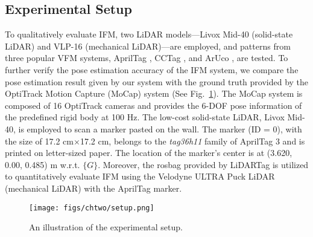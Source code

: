 \subsection{Experimental Setup}
To qualitatively evaluate IFM, two LiDAR models—Livox Mid-40 (solid-state LiDAR) and VLP-16 (mechanical LiDAR)—are employed, and patterns from three popular VFM systems, AprilTag \cite{ap3}, CCTag \cite{cctag}, and ArUco \cite{aruco}, are tested. To further verify the pose estimation accuracy of the IFM system, we compare the pose estimation result given by our system with the ground truth provided by the OptiTrack Motion Capture (MoCap) system (See Fig.~\ref{setup}). The MoCap system is composed of 16 OptiTrack cameras and provides the 6-DOF pose information of the predefined rigid body at 100 Hz. The low-cost solid-state LiDAR, Livox Mid-40, is employed to scan a marker pasted on the wall. The marker (ID = 0), with the size of 17.2 cm$\times$17.2 cm, belongs to the \textit{tag36h11} family of AprilTag 3 \cite{ap3} and is printed on letter-sized paper. The location of the marker's center is at (3.620, 0.00, 0.485) m w.r.t. $\{G\}$. Moreover, the rosbag provided by LiDARTag \cite{lt} is utilized to quantitatively evaluate IFM using the Velodyne ULTRA Puck LiDAR (mechanical LiDAR) with the AprilTag marker.
\par
\begin{figure}[H] 
	\centering
	\texttt{[image: figs/chtwo/setup.png]}
	\caption{An illustration of the experimental setup.}
	\label{setup}
\end{figure}

